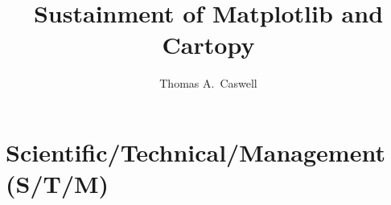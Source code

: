 \documentclass[12pt]{article}
\numberwithin{page}{section}
\begin{document}
\title{Sustainment of Matplotlib and Cartopy}
\author{Thomas A.\ Caswell}
\date{}
\maketitle

\setcounter{tocdepth}{2}
\tableofcontents
\thispagestyle{empty}
\newpage

\section{Scientific/Technical/Management (S/T/M)}
\setcounter{page}{1}
\end{document}

